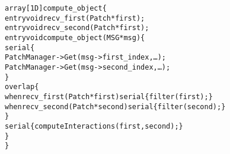 {%
\begin{center}
\begin{alltt}
  array[1D] compute_object \{
    entry void recv_first(Patch *first);
    entry void recv_second(Patch *first);
    entry void compute_object(MSG *msg)\{
      serial \{
         PatchManager->Get(msg->first_index,\dots);
         PatchManager->Get(msg->second_index,\dots);
      \}
      overlap \{
        when recv_first(Patch *first) serial \{ filter(first); \}
        when recv_second(Patch *second) serial \{ filter(second); \}
      \}
      serial \{ computeInteractions(first, second); \}
    \}
  \}
\end{alltt}
\end{center}
}


